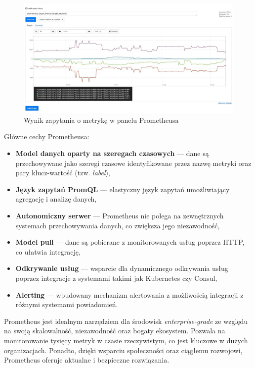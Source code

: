 \documentclass{article}
\begin{document}
\begin{figure}[H]
    \centering
    \includegraphics[width=1\linewidth]{prometheusPrzyklad.png}
    \caption{Wynik zapytania o metrykę w panelu Prometheusa}
    \label{fig:enter-label}
\end{figure}

Główne cechy Prometheusa:

\begin{itemize}
    \item \textbf{Model danych oparty na szeregach czasowych} — dane są przechowywane jako szeregi czasowe identyfikowane przez nazwę metryki oraz pary klucz-wartość (tzw. \textit{label}),
    \item \textbf{Język zapytań PromQL} — elastyczny język zapytań umożliwiający agregację i analizę danych,
    \item \textbf{Autonomiczny serwer} — Prometheus nie polega na zewnętrznych systemach przechowywania danych, co zwiększa jego niezawodność,
    \item \textbf{Model pull} — dane są pobierane z monitorowanych usług poprzez HTTP, co ułatwia integrację,
    \item \textbf{Odkrywanie usług} — wsparcie dla dynamicznego odkrywania usług poprzez integracje z systemami takimi jak Kubernetes czy Consul,
    \item \textbf{Alerting} — wbudowany mechanizm alertowania z możliwością integracji z różnymi systemami powiadomień.
\end{itemize}

Prometheus jest idealnym narzędziem dla środowisk \textit{enterprise-grade} ze względu na swoją skalowalność, niezawodność oraz bogaty ekosystem. Pozwala na monitorowanie tysięcy metryk w czasie rzeczywistym, co jest kluczowe w dużych organizacjach. Ponadto, dzięki wsparciu społeczności oraz ciągłemu rozwojowi, Prometheus oferuje aktualne i bezpieczne rozwiązania.
\end{document}
